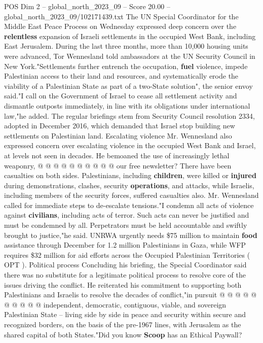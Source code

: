 \begin{textsample}{POS Dim 2 – global\_north\_2023\_09 – Score 20.00 – global\_north\_2023\_09/102171439.txt}  \label{ex:f2_pos_371}
The UN Special Coordinator for the Middle East Peace Process on Wednesday expressed deep concern over the \textbf{relentless} expansion of Israeli settlements in the occupied West Bank, including East Jerusalem.
During the last three months, more than 10,000 housing units were advanced, Tor Wennesland told ambassadors at the UN Security Council in New York."Settlements further entrench the occupation, \textbf{fuel} violence, impede Palestinian access to their land and resources, and systematically erode the viability of a Palestinian State as part of a two-State solution", the senior envoy said."I call on the Government of Israel to cease all settlement activity and dismantle outposts immediately, in line with its obligations under international law,"he added.
The regular briefings stem from Security Council resolution 2334, adopted in December 2016, which demanded that Israel stop building new settlements on Palestinian land.
Escalating violence Mr.
Wennesland also expressed concern over escalating violence in the occupied West Bank and Israel, at levels not seen in decades.
He bemoaned the use of increasingly lethal weaponry, @ @ @ @ @ @ @ @ @ @ our free newsletter?
There have been casualties on both sides.
Palestinians, including \textbf{children}, were killed or \textbf{injured} during demonstrations, clashes, security \textbf{operations}, and attacks, while Israelis, including members of the security forces, suffered casualties also.
Mr.
Wennesland called for immediate steps to de-escalate tensions."I condemn all acts of violence against \textbf{civilians}, including acts of terror.
Such acts can never be justified and must be condemned by all.
Perpetrators must be held accountable and swiftly brought to justice,"he said.
UNRWA urgently needs \$75 million to maintain \textbf{food} assistance through December for 1.2 million Palestinians in Gaza, while WFP requires \$32 million for aid efforts across the Occupied Palestinian Territories ( OPT ).
Political process Concluding his briefing, the Special Coordinator said there was no substitute for a legitimate political process to resolve core of the issues driving the conflict.
He reiterated his commitment to supporting both Palestinians and Israelis to resolve the decades of conflict,"in pursuit @ @ @ @ @ @ @ @ @ @ independent, democratic, contiguous, viable, and sovereign Palestinian State -- living side by side in peace and security within secure and recognized borders, on the basis of the pre-1967 lines, with Jerusalem as the shared capital of both States."Did you know \textbf{Scoop} has an Ethical Paywall?

\end{textsample}
